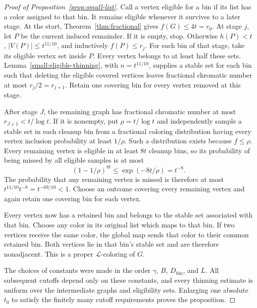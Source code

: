 \begin{proof}[Proof of Proposition~\ref{prop:small-list}]
Call a vertex eligible for a bin if its list has a color assigned to
that bin. It remains eligible whenever it survives to a later stage.
At the start, Theorem~\ref{thm:fractional} gives $f(G)\le4t=r_0$.
At stage $j$, let $P$ be the current induced remainder. If it is empty,
stop. Otherwise $h(P)<t$, $|V(P)|\le t^{11/10}$, and inductively
$f(P)\le r_j$. For each bin of that stage, take its eligible vertex set
inside $P$. Every vertex belongs to at least half these sets.
Lemma~\ref{small:eligible-thinning}, with $n=t^{11/10}$, supplies a
stable set for each bin such that deleting the eligible covered
vertices leaves fractional chromatic number at most
$r_j/2=r_{j+1}$. Retain one covering bin for every vertex removed at
this stage.

After stage $J$, the remaining graph has fractional chromatic number
at most $r_{J+1}<t/\log t$. If it is nonempty, put $\rho=t/\log t$ and
independently sample a stable set in each cleanup bin from a fractional
coloring distribution having every vertex inclusion probability at
least $1/\rho$. Such a distribution exists because $f\le\rho$.
Every remaining vertex is eligible in at least $8t$ cleanup bins, so
its probability of being missed by all eligible samples is at most
\[
 (1-1/\rho)^{8t}\le\exp(-8t/\rho)=t^{-8}.
\]
The probability that any remaining vertex is missed is therefore at
most $t^{11/10}t^{-8}=t^{-69/10}<1$. Choose an outcome covering every
remaining vertex and again retain one covering bin for each vertex.

Every vertex now has a retained bin and belongs to the stable set
associated with that bin. Choose any color in its original list which
maps to that bin. If two vertices receive the same color, the global
map sends that color to their common retained bin. Both vertices lie
in that bin's stable set and are therefore nonadjacent. This is a
proper $\mathcal L$-coloring of $G$.

The choices of constants were made in the order $\gamma$, $B$,
$D_{\mathrm{bin}}$, and $L$. All subsequent cutoffs depend only on these
constants, and every thinning estimate is uniform over the intermediate
graphs and eligibility sets. Enlarging one absolute $t_0$ to satisfy
the finitely many cutoff requirements proves the proposition.
\end{proof}
